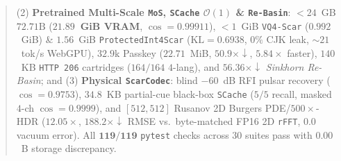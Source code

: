 \documentclass[10pt,twocolumn]{article}
\begin{document}
\begin{abstract}
(2) \textbf{Pretrained Multi-Scale \texttt{MoS}, \texttt{SCache} $\mathcal{O}(1)$ \& \texttt{Re-Basin}}: $<24$~GB $72.71\text{B}$ (\textbf{$21.89$~GiB VRAM}, $\cos=0.99911$), $<1$~GiB \texttt{VQ4-Scar} ($0.992$~GiB) \& $1.56$~GiB \texttt{ProtectedInt4Scar} ($\mathrm{KL}=0.6938$, $0\%$ CJK leak, $\sim 21$~tok/s WebGPU), $32.9\text{k}$ Passkey ($22.71$~MiB, $50.9\times\downarrow$, $5.84\times$ faster), $140$~KB \texttt{HTTP 206} cartridges ($164/164$ $4$-lang), and $56.36\times\downarrow$ \emph{Sinkhorn Re-Basin}; and
(3) \textbf{Physical \texttt{ScarCodec}}: blind $-60$~dB RFI pulsar recovery ($\cos=0.9753$), $34.8$~KB partial-cue black-box \texttt{SCache} ($5/5$ recall, masked $4$-ch $\cos=0.9999$), and $[512,512]$ Rusanov 2D Burgers PDE/$500\times$-HDR ($12.05\times$, $188.2\times\downarrow$ RMSE vs.\ byte-matched FP16 2D \texttt{rFFT}, $0.0$ vacuum error). All $\mathbf{119/119}$ \texttt{pytest} checks across $30$ suites pass with $0.00$~B storage discrepancy.
\end{abstract}
\end{document}

